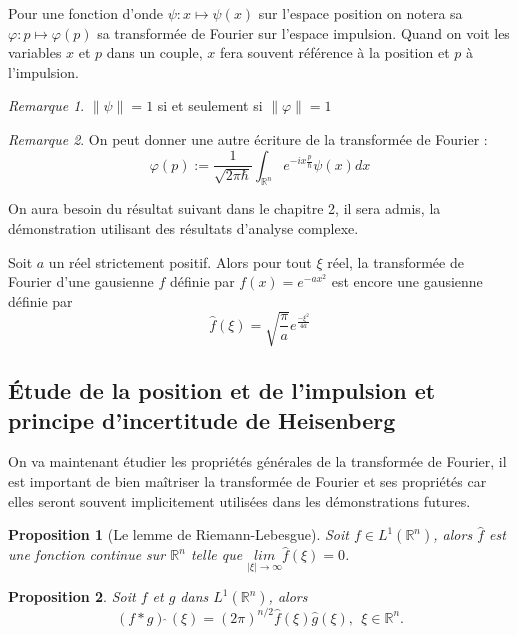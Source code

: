 \documentclass[a4paper, 12pt]{report}
\newcommand{\R}{\mathbb{R}} %
\newcommand{\ra}[1][]{\overset{#1}{\rightarrow}} %
\renewcommand{\.}{\cdot} %
\theoremstyle{break}
\newtheorem{proposition}{Proposition}
\theoremstyle{remark}
\newtheorem{remark}{Remarque}
\theoremstyle{proofstyle}
\begin{document}
Pour une fonction d'onde $\psi : x \mapsto \psi(x)$ sur l'espace position on notera sa $\varphi : p \mapsto \varphi(p)$ sa transformée de Fourier sur l'espace impulsion. Quand on voit les variables $x$ et $p$ dans un couple, $x$ fera souvent référence à la position et $p$ à l'impulsion.


\begin{remark}
    $\| \psi \| = 1$ si et seulement si $\| \varphi \| =1$
\end{remark}

\begin{remark}
    On peut donner une autre écriture de la transformée de Fourier :
    $$\varphi(p) := \frac{1}{\sqrt{2 \pi \hbar}} \int_{\mathbb{R}^n} e^{-ix \frac{p}{\hbar}} \psi(x) dx$$
\end{remark}

On aura besoin du résultat suivant dans le chapitre 2, il sera admis, la démonstration utilisant des résultats d'analyse complexe.

\begin{theorem}
    Soit $a$ un réel strictement positif. Alors pour tout $\xi$ réel, la transformée de Fourier d'une gausienne $f$ définie par $f(x) = e^{-ax^2}$ est encore une gausienne définie par
    $$\hat{f}(\xi) = \sqrt{\frac{\pi}{a}}e^{\frac{- \xi ^2}{4a}}$$
\end{theorem}
\subsection{Étude de la position et de l'impulsion et principe d'incertitude de Heisenberg}

On va maintenant étudier les propriétés générales de la transformée de Fourier, il est important de bien maîtriser la transformée de Fourier et ses propriétés car elles seront souvent implicitement utilisées dans les démonstrations futures.

\begin{proposition}[Le lemme de Riemann-Lebesgue]
    Soit $f \in L^1(\R^n)$, alors $\hat{f}$ est une fonction continue sur $\mathbb{R}^n$ telle que $\underset{|\xi| \ra \infty}{lim} \hat{f}(\xi) = 0$.
\end{proposition}

\begin{proposition}
    Soit $f$ et $g$ dans $L^1(\R^n)$, alors
    $$(f*g) \hat{~} (\xi) = (2 \pi)^{n/2} \hat{f} (\xi) \hat{g} (\xi),~~ \xi \in \R^n.$$
\end{proposition}
\end{document}
